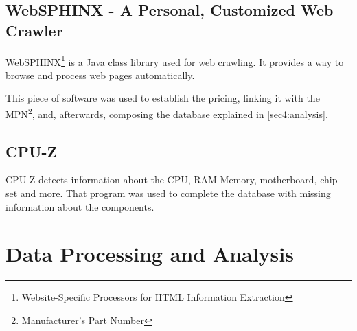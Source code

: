     \subsection{WebSPHINX - A Personal, Customized Web Crawler} \label{sec3:websphinx}
        WebSPHINX\footnote{Website-Specific Processors for HTML Information Extraction} is a Java class library used for web crawling. It provides a way to browse and process web pages automatically.
        
        This piece of software was used to establish the pricing, linking it with the MPN\footnote{Manufacturer's Part Number}, and, afterwards, composing the database explained in \ref{sec4:analysis}. 
    
    \subsection{CPU-Z} \label{sec3:cpu-z}
        CPU-Z detects information about the CPU, RAM Memory, motherboard, chip-set and more. That program was used to complete the database with missing information about the components.

\section{Data Processing and Analysis} \label{sec3:data_processing_analysis}
